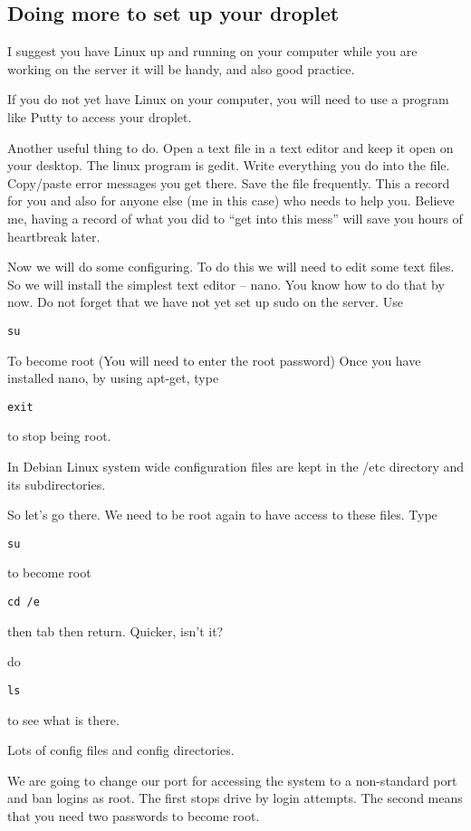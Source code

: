 \documentclass[12pt, a4paper]{article}
\begin{document}
\subsection*{Doing more to set up your droplet}


I suggest you have Linux up and running on your computer while you are working on the server  it will be handy, and also good practice.

If you do not yet have Linux on your computer, you will need to use a program like Putty to access your droplet.

Another useful thing to do. Open a text file in a text editor and keep it open on your desktop. The linux program is gedit. Write everything you do into the file. Copy/paste error messages you get there. Save the file frequently. This a record for you and also for anyone else (me in this case) who needs to help you. Believe me, having a record of what you did to “get into this mess” will save you hours of heartbreak later. 

Now we will do some configuring. To do this we will need to edit some text files. So we will install the simplest text editor – nano. You know how to do that by now. Do not forget that we have not yet set up sudo on the server.
Use
\begin{verbatim}
su
\end{verbatim}
To become root
(You will need to enter the root password)
Once you have installed nano, by uısing apt-get, type
\begin{verbatim}
exit
\end{verbatim}
to stop being root.

In Debian Linux system wide configuration files are kept in the /etc directory and its subdirectories.

So let's go there. We need to be root again to have access to these files. Type
\begin{verbatim}
su
\end{verbatim}
to become root
\begin{verbatim}
cd /e 
\end{verbatim}
then tab then return. Quicker, isn’t it?

do 

\begin{verbatim}
ls
\end{verbatim}

to see what is there. 

Lots of config files and config directories.

We are going to change our port for accessing the system to a non-standard port and ban logins as root. The first stops drive by login attempts. The second means that you need two passwords to become root.
\end{document}
